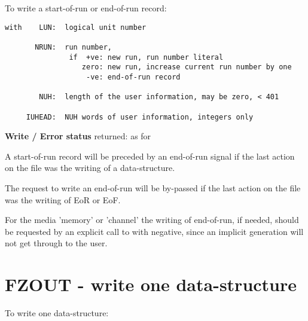 To write a start-of-run or end-of-run record:

\begin{verbatim}
with    LUN:  logical unit number

       NRUN:  run number,
               if  +ve: new run, run number literal
                  zero: new run, increase current run number by one
                   -ve: end-of-run record

        NUH:  length of the user information, may be zero, < 401

     IUHEAD:  NUH words of user information, integers only
\end{verbatim}

\textbf{Write / Error status} returned: as for 

A start-of-run record will be preceded by an end-of-run signal
if the last action on the file was the writing of a data-structure.

The request to write an end-of-run will be by-passed if the last
action on the file was the writing of EoR or EoF.

For the media 'memory' or 'channel' the writing of end-of-run,
if needed, should be requested by an explicit call to 
with  negative, since an implicit generation will not
get through to the user.

\section{FZOUT - write one data-structure}

To write one data-structure:

